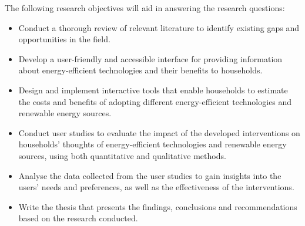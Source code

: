 The following research objectives will aid in answering the research questions: 
\begin{itemize}
  \item Conduct a thorough review of relevant literature to identify existing gaps and opportunities in the field. 
  \item Develop a user-friendly and accessible interface for providing information about energy-efficient technologies and their benefits to households.
  \item Design and implement interactive tools that enable households to estimate the costs and benefits of adopting different energy-efficient technologies and renewable energy sources.
  \item Conduct user studies to evaluate the impact of the developed interventions on households' thoughts of energy-efficient technologies and renewable energy sources, using both quantitative and qualitative methods.
  \item Analyse the data collected from the user studies to gain insights into the users' needs and preferences, as well as the effectiveness of the interventions.
  \item Write the thesis that presents the findings, conclusions and recommendations based on the research conducted. 
\end{itemize}


